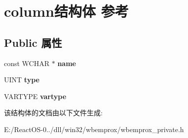 \hypertarget{structcolumn}{}\section{column结构体 参考}
\label{structcolumn}
\subsection*{Public 属性}
\begin{DoxyCompactItemize}
\item 
\mbox{\label{structcolumn_a254b2e646b6adc4a1b0776057fe624c3}} 
const W\+C\+H\+AR $\ast$ {\bfseries name}
\item 
\mbox{\label{structcolumn_ae4a6dd3693e5a818d274486d10019ffc}} 
U\+I\+NT {\bfseries type}
\item 
\mbox{\label{structcolumn_a90793361b48f72fb95c0cf92bc939022}} 
V\+A\+R\+T\+Y\+PE {\bfseries vartype}
\end{DoxyCompactItemize}


该结构体的文档由以下文件生成\+:\begin{DoxyCompactItemize}
\item 
E\+:/\+React\+O\+S-\/0../dll/win32/wbemprox/wbemprox\+\_\+private.\+h\end{DoxyCompactItemize}

